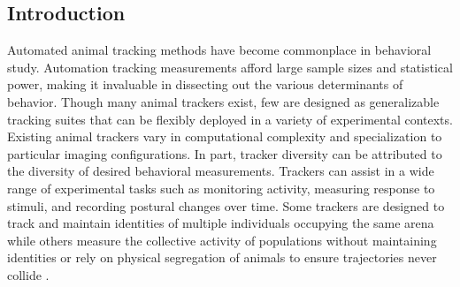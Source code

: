 \documentclass[10pt]{article}
\begin{document}
\vspace{1cm}
\begin{multicols}{2}
\section*{Introduction}

Automated animal tracking methods have become commonplace in behavioral study. Automation tracking measurements afford large sample sizes and statistical power, making it invaluable in dissecting out the various determinants of behavior. Though many animal trackers exist, few are designed as generalizable tracking suites that can be flexibly deployed in a variety of experimental contexts. Existing animal trackers vary in computational complexity and specialization to particular imaging configurations. In part, tracker diversity can be attributed to the diversity of desired behavioral measurements. Trackers can assist in a wide range of experimental tasks such as monitoring activity, measuring response to stimuli\cite{Fry_TrackFly_2008,Donelson_High_2012}, and recording postural changes over time\cite{Mathis_DeepLabCut_2018,Pereira_Fast_2018}. Some trackers are designed to track and maintain identities of multiple individuals occupying the same arena \cite{Prez-Escudero_idTracker_2014,Eyjolfsdottir_Detecting_2014,Rodriguez_ToxId_2017} while others measure the collective activity of populations without maintaining identities or rely on physical segregation of animals to ensure trajectories never collide \cite{Ramot_The_2008,Swierczek_High_2011,Itskovits_A_2017}. 


\end{multicols}
\end{document}
